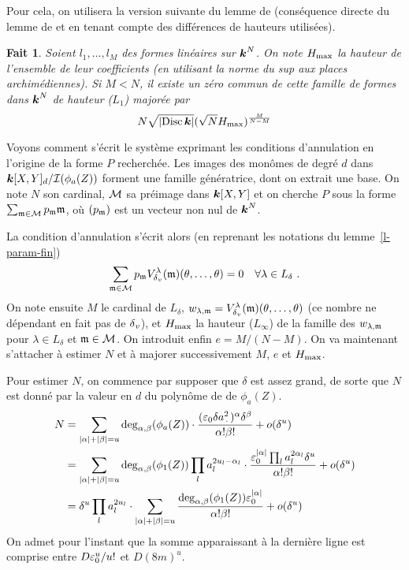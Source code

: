 \documentclass[11pt, twoside, a4paper]{article}
\newtheorem{fait}[thm]{Fait}
\theoremstyle{definition}
\begin{document}
Pour cela, on utilisera la version suivante du lemme de 
(conséquence directe du lemme de  et  en tenant compte
des différences de hauteurs utilisées).

\begin{fait}
  Soient $l_1, \ldots, l_M$ des formes linéaires sur $\boldsymbol{k}^N$. On note $H_{\mathrm{max}}$
  la hauteur de l'ensemble de leur coefficients (en utilisant la norme du sup
  aux places archimédiennes). Si $M < N$, il existe un zéro commun de cette
  famille de formes dans $\boldsymbol{k}^N$ de hauteur ($L_1$) majorée par
  \[
    N \sqrt{\left\lvert\operatorname{Disc}\boldsymbol{k}\right\rvert} ( \sqrt N H_{\mathrm{max}} )^\frac M{N-M}
  \]
\end{fait}

Voyons comment s'écrit le système exprimant les conditions d'annulation en
l'origine de la forme $P$ recherchée. Les images des monômes de degré $d$ dans
$\boldsymbol{k}[X, Y]_d / \mathcal I(\phi_a(Z))$ forment une famille génératrice, dont on
extrait une base.  On note $N$ son cardinal, ${\mathcal M}$ sa préimage dans $\boldsymbol{k}[X,
Y]$ et on cherche $P$ sous la forme $\sum_{{\mathfrak m}\in{\mathcal M}} p_{\mathfrak m} {\mathfrak m}$,
où  $(p_{\mathfrak m})$ est un vecteur non nul de $\boldsymbol{k}^N$.

La condition d'annulation s'écrit alors (en reprenant les notations du
lemme~\ref{l-param-fin}) 
\[
  \sum_{{\mathfrak m}\in{\mathcal M}}
  p_{\mathfrak m} V_{\delta\smash{_v}}^\lambda({\mathfrak m})(\theta, \ldots, \theta)
  = 0 \quad 
  \forall \lambda\in L_\delta \text{ .}
\]
On note ensuite $M$ le cardinal de $L_\delta$, $w_{\lambda, {\mathfrak m}} =
V_{\delta\smash{_v}}^\lambda({\mathfrak m})(\theta, \ldots, \theta)$ (ce nombre ne dépendant en fait pas
de ${\delta\smash{_v}}$), et $H_{\mathrm{max}}$ la hauteur ($L_\infty$) de la famille des $w_{\lambda,
  {\mathfrak m}}$ pour $\lambda \in L_\delta$ et ${\mathfrak m} \in {\mathcal M}$. On introduit
enfin $e = M/(N-M)$. On va maintenant s'attacher à estimer $N$ et à majorer
successivement $M$, $e$ et $H_{\mathrm{max}}$.

Pour estimer $N$, on commence par supposer que $\delta$ est assez grand, de
sorte que $N$ est donné par la valeur en $d$ du polynôme de  de
$\phi_a(Z)$. 
\begin{align*}
  N 
  & = \sum_{\lgr\alpha + \lgr\beta = u}
    \deg_{\alpha, \beta}(\phi_a(Z))
    \cdot \frac{ 
      (\eps_0 \delta a_\truc^2)^\alpha \delta^\beta}{%
      \alpha! \beta!}
    + o(\delta^u) \\
  & = \sum_{\lgr\alpha + \lgr\beta = u}
    \deg_{\alpha, \beta}(\phi_1(Z)) \prod_l a_l^{2u_l - \alpha_l}
    \cdot \frac{ 
      \eps_0^{\lgr\alpha} \prod_l a_l^{2\alpha_l} \delta^u}{%
      \alpha! \beta!}
    + o(\delta^u) \\
  & = \delta^u \prod_l a_l^{2u_l} \cdot 
    \sum_{\lgr\alpha + \lgr\beta = u}
    \frac{
      \deg_{\alpha, \beta} (\phi_1(Z)) \eps_0^{\lgr\alpha}}{
      \alpha! \beta!}
    + o(\delta^u)
\end{align*}
On admet pour l'instant que la somme apparaissant à la dernière ligne est
comprise entre $D \varepsilon_0^u / u!$ et $D (8m)^u$.
\end{document}
